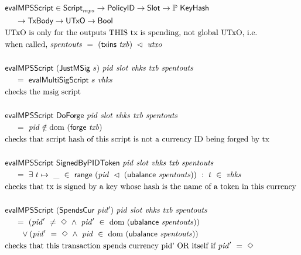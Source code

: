\begin{figure*}[htb]
  \begin{align*}
    & \fun{evalMPSScript} \in\ScriptMPS\to\PolicyID\to\Slot\to\powerset\KeyHash \\
    &~~~~\to\TxBody\to\UTxO \to\Bool  \\
    & \text{UTxO is only for the outputs THIS tx is spending, not global UTxO, i.e.} \\
    & \text{when called,}~\var{spentouts}~=~(\fun{txins}~\var{txb}) ~\restrictdom~\var{utxo} \\~\\
    & \fun{evalMPSScript}  ~(\type{JustMSig}~s)~\var{pid}~\var{slot}~\var{vhks}
     ~\var{txb}~\var{spentouts} \\
    &~~~~ =~ \fun{evalMultiSigScript}~s~\var{vhks} \\
    & \text {checks the msig script}\\~\\
    & \fun{evalMPSScript}
     ~\type{DoForge}~\var{pid}~ \var{slot}~\var{vhks} ~\var{txb}~\var{spentouts} \\
    &~~~~ =~ \var{pid} \notin \dom~(\fun{forge}~\var{txb}) \\
    & \text {checks that script hash of this script is not a currency ID being forged by tx}  \\~\\
    & \fun{evalMPSScript}
     ~\type{SignedByPIDToken}~\var{pid}~ \var{slot}~\var{vhks} ~\var{txb}~\var{spentouts} \\
    &~~~~ =~ \exists~t\mapsto ~\_~\in~ \fun{range}~(\var{pid}~ \restrictdom~(\fun{ubalance}~\var{spentouts})) ~:~ t~\in~\var{vhks} \\
    & \text{checks that tx is signed by a key whose hash is the name of a token in this currency}
    \\~\\
    & \fun{evalMPSScript}
     ~(\type{SpendsCur}~\var{pid'})~\var{pid}~ \var{slot}~\var{vhks} ~\var{txb}~\var{spentouts} \\
    &~~~~ =~ (\var{pid'}~\neq~\Nothing ~\wedge ~\var{pid'}~\in~ \dom~(\fun{ubalance}~\var{spentouts}))\\
    &~~~~~~ \vee (\var{pid'}~=~\Nothing ~\wedge ~\var{pid}~\in~ \dom~(\fun{ubalance}~\var{spentouts})) \\
    & \text{checks that this transaction spends currency pid' OR itself if}~\var{pid'}~=~\Nothing
    \\~\\

\end{align*}
\end{figure*}
